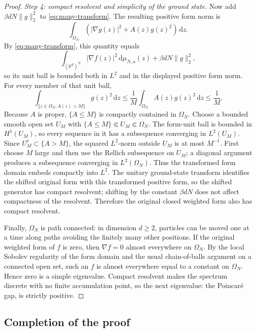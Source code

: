 \documentclass[12pt,reqno,letterpaper]{amsart}
\theoremstyle{definition}
\theoremstyle{remark}
\numberwithin{equation}{section}
\newcommand{\R}{\mathbb R}
\newcommand{\dd}{\,\mathrm d}
\newcommand{\be}{\beta}
\begin{document}
\begin{proof}
\emph{Step 4: compact resolvent and simplicity of the ground state.}
Now add \(\be dN\|g\|_2^2\) to \eqref{eq:many-transform}.  The resulting
positive form norm is
\begin{equation*}
 \int_{\Omega_N}(|\nabla g(z)|^2+A(z)g(z)^2)\dd z.
\end{equation*}
By \eqref{eq:many-transform}, this quantity equals
\[
 \int_{(\R^d)^N}|\nabla f(z)|^2\dd\mu_{N,a}(z)
 +\be dN\|g\|_2^2,
\]
so its unit ball is bounded both in \(L^2\) and in the displayed positive
form norm.  For every member of that unit ball,
\[
 \int_{\{z\in\Omega_N:A(z)>M\}}g(z)^2\dd z
 \le\frac1M\int_{\Omega_N}A(z)g(z)^2\dd z\le\frac1M.
\]
Because \(A\) is proper, \(\{A\le M\}\) is compactly contained in
\(\Omega_N\).  Choose a bounded smooth open set
\(U_M\) with $\{A\le M\}\Subset U_M\Subset\Omega_N.$
The form-unit ball is bounded in \(H^1(U_M)\), so every sequence in it has
a subsequence converging in \(L^2(U_M)\).  Since
\(U_M^c\subset\{A>M\}\), the squared \(L^2\)-norm outside \(U_M\) is at
most \(M^{-1}\).  First choose \(M\) large and then use the Rellich
subsequence on \(U_M\); a diagonal argument produces a subsequence converging
in \(L^2(\Omega_N)\).  Thus the transformed form domain embeds compactly
into \(L^2\).  The unitary ground-state transform identifies the shifted
original form with this transformed positive form, so the shifted generator
has compact resolvent; shifting by the constant \(\be dN\) does not affect
compactness of the resolvent.  Therefore the original closed weighted form
also has compact resolvent.

Finally, \(\Omega_N\) is path connected: in dimension \(d\ge2\), particles
can be moved one at a time along paths avoiding the finitely many other
positions.  If the original weighted form of \(f\) is zero, then
\(\nabla f=0\) almost everywhere on \(\Omega_N\).  By the local Sobolev
regularity of the form domain and the usual chain-of-balls argument on a
connected open set, such an \(f\) is almost everywhere equal to a constant on
\(\Omega_N\).  Hence zero is a simple eigenvalue.  Compact resolvent makes
the spectrum discrete with no finite accumulation point, so the next
eigenvalue: the Poincar\'e gap, is strictly positive.
\end{proof}

\subsection{Completion of the proof}
\end{document}
